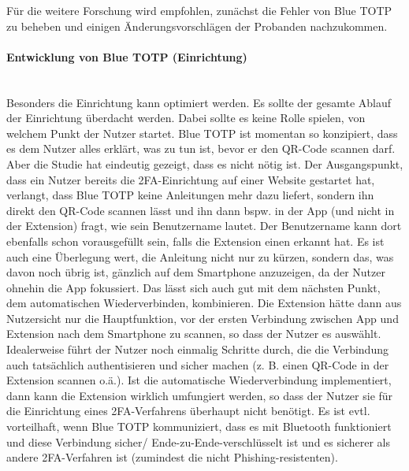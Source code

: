Für die weitere Forschung wird empfohlen, zunächst die Fehler von Blue TOTP zu 
beheben und einigen Änderungsvorschlägen der Probanden nachzukommen.

\paragraph*{Entwicklung von Blue TOTP (Einrichtung)}
\mbox{} \vspace{0.1cm} \\
Besonders die Einrichtung kann optimiert werden. Es sollte der gesamte Ablauf 
der Einrichtung überdacht werden. Dabei sollte es keine Rolle spielen, von 
welchem Punkt der Nutzer startet. Blue TOTP ist momentan so konzipiert, dass 
es dem Nutzer alles erklärt, was zu tun ist, bevor er den QR-Code scannen 
darf. Aber die Studie hat eindeutig gezeigt, dass es nicht nötig ist. Der 
Ausgangspunkt, dass ein Nutzer bereits die 2FA-Einrichtung auf einer Website 
gestartet hat, verlangt, dass Blue TOTP keine Anleitungen mehr dazu liefert, 
sondern ihn direkt den QR-Code scannen lässt und ihn dann bspw. in der App 
(und nicht in der Extension) fragt, wie sein Benutzername lautet. Der 
Benutzername kann dort ebenfalls schon vorausgefüllt sein, falls die Extension 
einen erkannt hat. Es ist auch eine Überlegung wert, die Anleitung nicht nur 
zu kürzen, sondern das, was davon noch übrig ist, gänzlich auf dem Smartphone 
anzuzeigen, da der Nutzer ohnehin die App fokussiert. Das lässt sich auch gut 
mit dem nächsten Punkt, dem automatischen Wiederverbinden, kombinieren. Die 
Extension hätte dann aus Nutzersicht nur die Hauptfunktion, vor der ersten 
Verbindung zwischen App und Extension nach dem Smartphone zu scannen, so dass 
der Nutzer es auswählt. Idealerweise führt der Nutzer noch einmalig Schritte 
durch, die die Verbindung auch tatsächlich authentisieren und sicher machen (z.
B. einen QR-Code in der Extension scannen o.ä.). Ist die automatische 
Wiederverbindung implementiert, dann kann die Extension wirklich umfungiert 
werden, so dass der Nutzer sie für die Einrichtung eines 2FA-Verfahrens 
überhaupt nicht benötigt. Es ist evtl. vorteilhaft, wenn Blue TOTP 
kommuniziert, dass es mit Bluetooth funktioniert und diese Verbindung sicher/
Ende-zu-Ende-verschlüsselt ist und es sicherer als andere 2FA-Verfahren ist 
(zumindest die nicht Phishing-resistenten).

